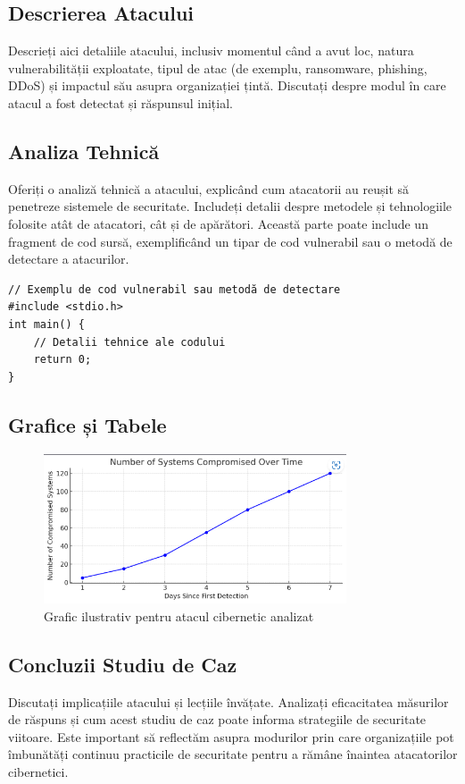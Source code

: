 \documentclass[12pt]{article}
\begin{document}
\subsection{Descrierea Atacului}
Descrieți aici detaliile atacului, inclusiv momentul când a avut loc, natura vulnerabilității exploatate, tipul de atac (de exemplu, ransomware, phishing, DDoS) și impactul său asupra organizației țintă. Discutați despre modul în care atacul a fost detectat și răspunsul inițial.

\subsection{Analiza Tehnică}
Oferiți o analiză tehnică a atacului, explicând cum atacatorii au reușit să penetreze sistemele de securitate. Includeți detalii despre metodele și tehnologiile folosite atât de atacatori, cât și de apărători. Această parte poate include un fragment de cod sursă, exemplificând un tipar de cod vulnerabil sau o metodă de detectare a atacurilor.

\begin{verbatim}
// Exemplu de cod vulnerabil sau metodă de detectare
#include <stdio.h>
int main() {
    // Detalii tehnice ale codului
    return 0;
}
\end{verbatim}

\subsection{Grafice și Tabele}

\begin{figure}[h]
\centering
\includegraphics[width=0.8\textwidth]{poze/grafic detectie.png}
\caption{Grafic ilustrativ pentru atacul cibernetic analizat}
\end{figure}

\subsection{Concluzii Studiu de Caz}
Discutați implicațiile atacului și lecțiile învățate. Analizați eficacitatea măsurilor de răspuns și cum acest studiu de caz poate informa strategiile de securitate viitoare. Este important să reflectăm asupra modurilor prin care organizațiile pot îmbunătăți continuu practicile de securitate pentru a rămâne înaintea atacatorilor cibernetici.
\end{document}
